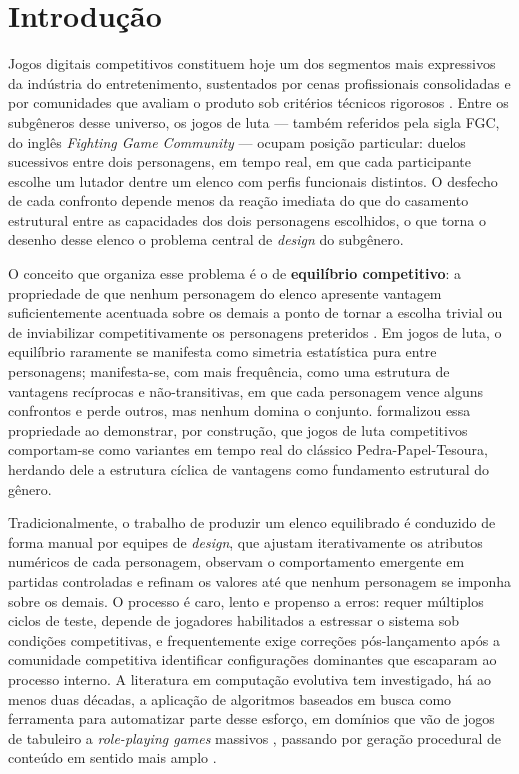 \chapter[Introdução]{Introdução}

Jogos digitais competitivos constituem hoje um dos segmentos mais expressivos da indústria do entretenimento, sustentados por cenas profissionais consolidadas e por comunidades que avaliam o produto sob critérios técnicos rigorosos \cite{yannakakis2018ai}. Entre os subgêneros desse universo, os jogos de luta --- também referidos pela sigla FGC, do inglês \textit{Fighting Game Community} --- ocupam posição particular: duelos sucessivos entre dois personagens, em tempo real, em que cada participante escolhe um lutador dentre um elenco com perfis funcionais distintos. O desfecho de cada confronto depende menos da reação imediata do que do casamento estrutural entre as capacidades dos dois personagens escolhidos, o que torna o desenho desse elenco o problema central de \textit{design} do subgênero.

O conceito que organiza esse problema é o de \textbf{equilíbrio competitivo}: a propriedade de que nenhum personagem do elenco apresente vantagem suficientemente acentuada sobre os demais a ponto de tornar a escolha trivial ou de inviabilizar competitivamente os personagens preteridos \cite{adams2014fundamentals,elias2012characteristics}. Em jogos de luta, o equilíbrio raramente se manifesta como simetria estatística pura entre personagens; manifesta-se, com mais frequência, como uma estrutura de vantagens recíprocas e não-transitivas, em que cada personagem vence alguns confrontos e perde outros, mas nenhum domina o conjunto.  formalizou essa propriedade ao demonstrar, por construção, que jogos de luta competitivos comportam-se como variantes em tempo real do clássico Pedra-Papel-Tesoura, herdando dele a estrutura cíclica de vantagens como fundamento estrutural do gênero.

Tradicionalmente, o trabalho de produzir um elenco equilibrado é conduzido de forma manual por equipes de \textit{design}, que ajustam iterativamente os atributos numéricos de cada personagem, observam o comportamento emergente em partidas controladas e refinam os valores até que nenhum personagem se imponha sobre os demais. O processo é caro, lento e propenso a erros: requer múltiplos ciclos de teste, depende de jogadores habilitados a estressar o sistema sob condições competitivas, e frequentemente exige correções pós-lançamento após a comunidade competitiva identificar configurações dominantes que escaparam ao processo interno. A literatura em computação evolutiva tem investigado, há ao menos duas décadas, a aplicação de algoritmos baseados em busca como ferramenta para automatizar parte desse esforço, em domínios que vão de jogos de tabuleiro \cite{hom2007automatic,browne2010evolutionary} a \textit{role-playing games} massivos \cite{chen2014mmorpg}, passando por geração procedural de conteúdo em sentido mais amplo \cite{togelius2011searchbased}.

